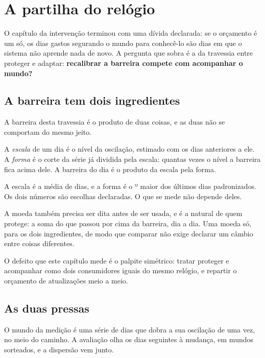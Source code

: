 \chapter{A partilha do relógio}\label{cap:partilha}

O capítulo da intervenção terminou com uma dívida declarada: se o orçamento é um só, os dias gastos
segurando o mundo para conhecê-lo são dias em que o sistema não aprende nada de novo. A pergunta
que sobra é a da travessia entre proteger e adaptar: \textbf{recalibrar a barreira compete com acompanhar
o mundo?}

\section{A barreira tem dois ingredientes}

A barreira desta travessia é o produto de duas coisas, e as duas não se comportam do mesmo jeito.

\begin{definicao}\label{def:escala-forma}
A \emph{escala} de um dia é o nível da oscilação, estimado com os dias anteriores a ele. A
\emph{forma} é o corte da série já dividida pela escala: quantas vezes o nível a barreira fica acima
dele. A barreira do dia é o produto da escala pela forma.
\end{definicao}

A escala é a média de \numPartilhaJanelaEscala{} dias, e a forma é o \numPartilhaPosto{}º maior dos
últimos \numPartilhaJanelaForma{} dias padronizados. Os dois números são escolhas declaradas. O que se
mede não depende deles.

A moeda também precisa ser dita antes de ser usada, e é a natural de quem protege: a soma do que
passou por cima da barreira, dia a dia. Uma moeda só, para os dois ingredientes, de modo que comparar
não exige declarar um câmbio entre coisas diferentes.

O defeito que este capítulo mede é o palpite simétrico: tratar proteger e acompanhar como dois
consumidores iguais do mesmo relógio, e repartir o orçamento de atualizações meio a meio.

\section{As duas pressas}

O mundo da medição é uma série de \numPartilhaDiasDeSerie{} dias que dobra a sua oscilação de uma
vez, no meio do caminho. A avaliação olha os \numPartilhaHorizonte{} dias seguintes à mudança, em
\numPartilhaSementes{} mundos sorteados, e a dispersão vem junto.


